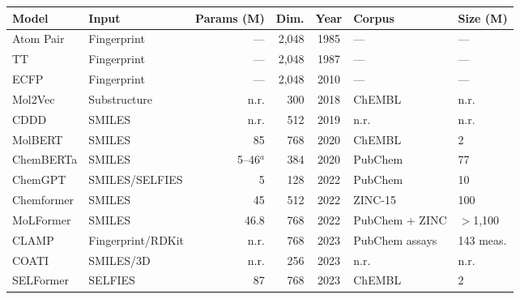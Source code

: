 
\begin{table}[p]
  \centering
  \small
  \setlength{\tabcolsep}{4pt}
  \begin{tabular}{@{} l l r r c l l @{}}
    \toprule
    \textbf{Model}
      & \textbf{Input}
      & \textbf{Params (M)}
      & \textbf{Dim.}
      & \textbf{Year}
      & \textbf{Corpus}
      & \textbf{Size (M)} \\
    \midrule
    Atom Pair             & Fingerprint       & ---             & 2,048 & 1985 & ---              & --- \\
    TT                    & Fingerprint       & ---             & 2,048 & 1987 & ---              & --- \\
    ECFP                  & Fingerprint       & ---             & 2,048 & 2010 & ---              & --- \\
    Mol2Vec               & Substructure      & n.r.            & 300   & 2018 & ChEMBL           & n.r. \\
    CDDD                  & SMILES            & n.r.            & 512   & 2019 & n.r.             & n.r. \\
    MolBERT               & SMILES            & 85              & 768   & 2020 & ChEMBL           & 2 \\
    ChemBERTa             & SMILES            & 5--46$^{a}$     & 384   & 2020 & PubChem          & 77 \\
    ChemGPT               & SMILES/SELFIES    & 5               & 128   & 2022 & PubChem          & 10 \\
    Chemformer            & SMILES            & 45              & 512   & 2022 & ZINC-15          & 100 \\
    MoLFormer             & SMILES            & 46.8            & 768   & 2022 & PubChem + ZINC   & $>$1,100 \\
    CLAMP                 & Fingerprint/RDKit  & n.r.            & 768   & 2023 & PubChem assays   & 143 meas. \\
    COATI                 & SMILES/3D         & n.r.            & 256   & 2023 & n.r.             & n.r. \\
    SELFormer             & SELFIES           & 87              & 768   & 2023 & ChEMBL           & 2 \\

\end{tabular}
\end{table}
